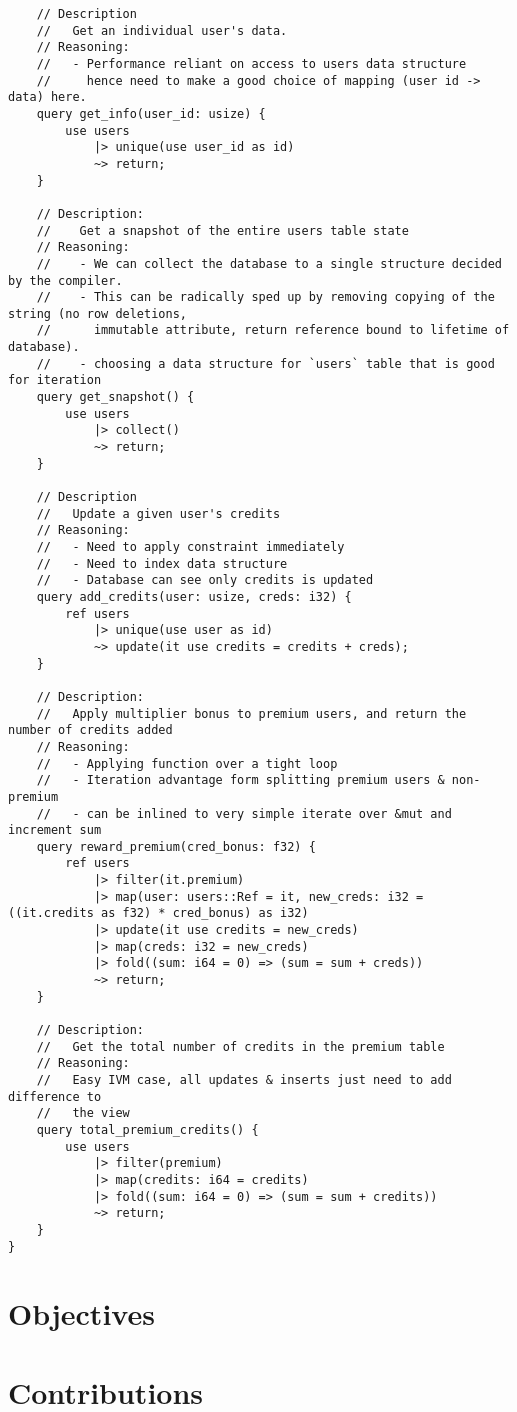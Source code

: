 \begin{verbatim}
    // Description
    //   Get an individual user's data.
    // Reasoning:
    //   - Performance reliant on access to users data structure
    //     hence need to make a good choice of mapping (user id -> data) here.
    query get_info(user_id: usize) {
        use users
            |> unique(use user_id as id)
            ~> return;
    }

    // Description:
    //    Get a snapshot of the entire users table state
    // Reasoning:
    //    - We can collect the database to a single structure decided by the compiler.
    //    - This can be radically sped up by removing copying of the string (no row deletions,
    //      immutable attribute, return reference bound to lifetime of database).
    //    - choosing a data structure for `users` table that is good for iteration
    query get_snapshot() {
        use users
            |> collect()
            ~> return;
    }

    // Description
    //   Update a given user's credits
    // Reasoning:
    //   - Need to apply constraint immediately
    //   - Need to index data structure
    //   - Database can see only credits is updated
    query add_credits(user: usize, creds: i32) {
        ref users
            |> unique(use user as id)
            ~> update(it use credits = credits + creds);
    }

    // Description:
    //   Apply multiplier bonus to premium users, and return the number of credits added
    // Reasoning:
    //   - Applying function over a tight loop
    //   - Iteration advantage form splitting premium users & non-premium
    //   - can be inlined to very simple iterate over &mut and increment sum
    query reward_premium(cred_bonus: f32) {
        ref users
            |> filter(it.premium)
            |> map(user: users::Ref = it, new_creds: i32 = ((it.credits as f32) * cred_bonus) as i32)
            |> update(it use credits = new_creds)
            |> map(creds: i32 = new_creds)
            |> fold((sum: i64 = 0) => (sum = sum + creds))
            ~> return;
    }

    // Description:
    //   Get the total number of credits in the premium table
    // Reasoning:
    //   Easy IVM case, all updates & inserts just need to add difference to
    //   the view
    query total_premium_credits() {
        use users
            |> filter(premium)
            |> map(credits: i64 = credits)
            |> fold((sum: i64 = 0) => (sum = sum + credits))
            ~> return;
    }
}    
\end{verbatim}
\section{Objectives}



\section{Contributions}
